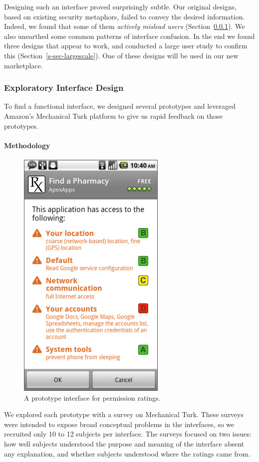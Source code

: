 \documentclass[11pt]{article}
\newcommand{\refsec}[1]{Section~\ref{#1}}
\begin{document}
Designing such an interface proved surprisingly subtle. 
Our original designs, based on existing security 
metaphors, failed to convey the desired information.
Indeed, we found that some of them \emph{actively 
mislead users} (\refsec{sec-ui-design}).
We also unearthed some common patterns of interface
confusion. In the end we found three designs that appear to work, and
conducted a large user study to confirm this
(\refsec{s-sec-largescale}). One of these designs will be used in our new
marketplace.

\subsubsection{Exploratory Interface Design}
\label{sec-ui-design}

To find a functional interface, we designed several prototypes and 
leveraged Amazon's Mechanical Turk platform to give us rapid feedback 
on those prototypes.

\paragraph{Methodology}
\label{subsec-small-methods}

\begin{figure}
\centering
    \includegraphics[width=.35\linewidth]{img/GradesPerms.png}
    \caption{A prototype interface for permission ratings.}
    \label{grade-perms}
\end{figure}

We explored each prototype with a survey on Mechanical Turk.
These surveys were 
intended to expose broad conceptual problems 
in the interfaces, so we recruited only 10 to 12 
subjects per interface. The surveys focused on two issues: how well subjects 
understood the purpose and meaning of the interface absent any explanation, 
and whether subjects understood where the ratings came from.
\end{document}
